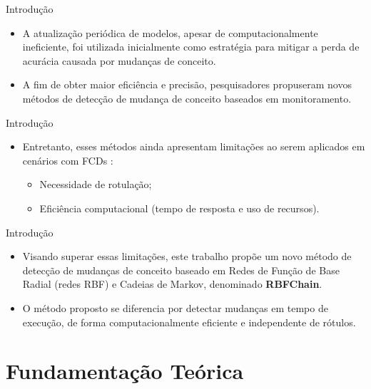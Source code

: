\documentclass[10pt]{beamer}
\begin{document}
\begin{frame}{Introdução}
    \begin{itemize}
        \item<1 -> A atualização periódica de modelos, apesar de computacionalmente ineficiente, foi utilizada inicialmente como estratégia para mitigar a perda de acurácia causada por mudanças de conceito.
        \item<1 -> A fim de obter maior eficiência e precisão, pesquisadores propuseram novos métodos de detecção de mudança de conceito baseados em monitoramento.
      \end{itemize}
\end{frame}


\begin{frame}{Introdução}
    \begin{itemize}
        \item<1 -> Entretanto, esses métodos ainda apresentam limitações ao serem aplicados em cenários com FCDs \cite{Aggarwal:2006:DSM:1196418}:
        \begin{itemize}
            \item<1 -> Necessidade de rotulação;
            \item<1 -> Eficiência computacional (tempo de resposta e uso de recursos).
        \end{itemize}
      \end{itemize}
\end{frame}

\begin{frame}{Introdução}
    \begin{itemize}
        \item<1 -> Visando superar essas limitações, este trabalho propõe um novo método de detecção de mudanças de conceito baseado em \alert{Redes de Função de Base Radial (redes RBF) e Cadeias de Markov}, denominado \textbf{\alert{RBFChain}}.
        \item<1 -> O método proposto se diferencia por detectar mudanças em \alert{tempo de execução}, de forma computacionalmente \alert{eficiente} e \alert{independente de rótulos}.
    \end{itemize}
\end{frame}

\section{Fundamentação Teórica}
\end{document}
